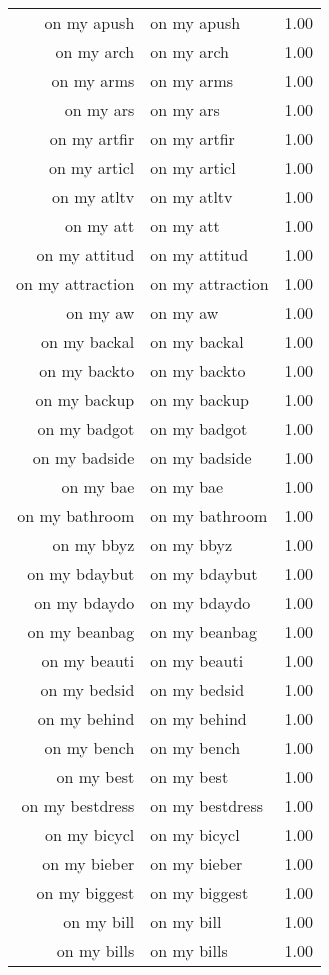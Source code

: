 \begin{table}[ht]
\begin{tabular}{rlr}
  on my apush & on my apush & 1.00 \\ 
  on my arch & on my arch & 1.00 \\ 
  on my arms & on my arms & 1.00 \\ 
  on my ars & on my ars & 1.00 \\ 
  on my artfir & on my artfir & 1.00 \\ 
  on my articl & on my articl & 1.00 \\ 
  on my atltv & on my atltv & 1.00 \\ 
  on my att & on my att & 1.00 \\ 
  on my attitud & on my attitud & 1.00 \\ 
  on my attraction & on my attraction & 1.00 \\ 
  on my aw & on my aw & 1.00 \\ 
  on my backal & on my backal & 1.00 \\ 
  on my backto & on my backto & 1.00 \\ 
  on my backup & on my backup & 1.00 \\ 
  on my badgot & on my badgot & 1.00 \\ 
  on my badside & on my badside & 1.00 \\ 
  on my bae & on my bae & 1.00 \\ 
  on my bathroom & on my bathroom & 1.00 \\ 
  on my bbyz & on my bbyz & 1.00 \\ 
  on my bdaybut & on my bdaybut & 1.00 \\ 
  on my bdaydo & on my bdaydo & 1.00 \\ 
  on my beanbag & on my beanbag & 1.00 \\ 
  on my beauti & on my beauti & 1.00 \\ 
  on my bedsid & on my bedsid & 1.00 \\ 
  on my behind & on my behind & 1.00 \\ 
  on my bench & on my bench & 1.00 \\ 
  on my best & on my best & 1.00 \\ 
  on my bestdress & on my bestdress & 1.00 \\ 
  on my bicycl & on my bicycl & 1.00 \\ 
  on my bieber & on my bieber & 1.00 \\ 
  on my biggest & on my biggest & 1.00 \\ 
  on my bill & on my bill & 1.00 \\ 
  on my bills & on my bills & 1.00 \\ 

\end{tabular}
\end{table}
